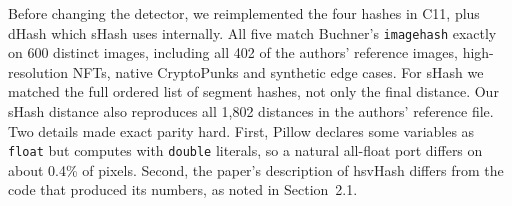 Before changing the detector, we reimplemented the four hashes in C11, plus dHash which sHash
uses internally. All five match Buchner's \texttt{imagehash} exactly on 600 distinct images,
including all 402 of the authors' reference images, high-resolution NFTs, native CryptoPunks
and synthetic edge cases. For sHash we matched the full ordered list of segment hashes, not
only the final distance. Our sHash distance also reproduces all 1,802 distances in the
authors' reference file. Two details made exact parity hard. First, Pillow declares some
variables as \texttt{float} but computes with \texttt{double} literals, so a natural all-float
port differs on about 0.4\% of pixels. Second, the paper's description of hsvHash differs from
the code that produced its numbers, as noted in Section~2.1.
